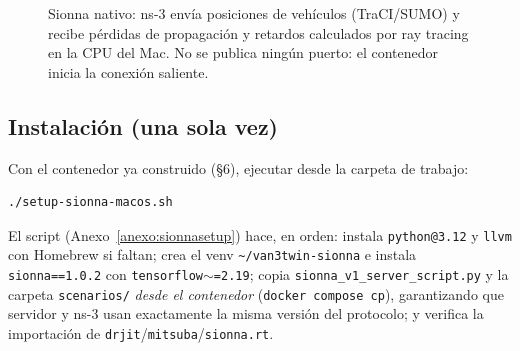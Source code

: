 \documentclass[11pt,a4paper]{article}
\begin{document}
\begin{figure}[h!]
\centering
{}
\caption{Sionna nativo: ns-3 env\'ia posiciones de veh\'iculos (TraCI/SUMO) y
recibe p\'erdidas de propagaci\'on y retardos calculados por ray tracing en la
CPU del Mac. No se publica ning\'un puerto: el contenedor inicia la conexi\'on
saliente.}
\label{fig:sionnaarch}
\end{figure}

\subsection{Instalaci\'on (una sola vez)}

Con el contenedor ya construido (\S6), ejecutar desde la carpeta de trabajo:

\begin{lstlisting}[language=bash]
./setup-sionna-macos.sh
\end{lstlisting}

El script (Anexo~\ref{anexo:sionnasetup}) hace, en orden: instala
\texttt{python@3.12} y \texttt{llvm} con Homebrew si faltan; crea el venv
\texttt{\textasciitilde/van3twin-sionna} e instala \texttt{sionna==1.0.2} con
\texttt{tensorflow$\sim$=2.19}; copia \texttt{sionna\_v1\_server\_script.py} y
la carpeta \texttt{scenarios/} \emph{desde el contenedor} (\texttt{docker
compose cp}), garantizando que servidor y ns-3 usan exactamente la misma
versi\'on del protocolo; y verifica la importaci\'on de
\texttt{drjit}/\texttt{mitsuba}/\texttt{sionna.rt}.
\end{document}
